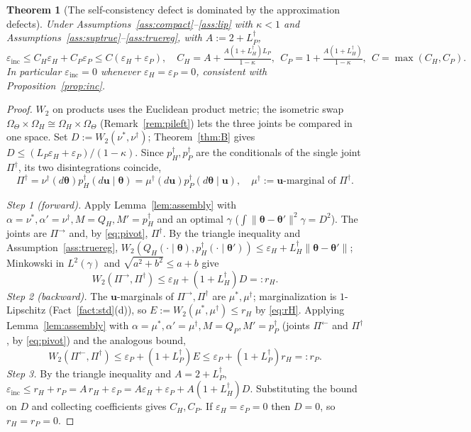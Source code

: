 \documentclass[11pt]{article}
\theoremstyle{plain}
\newtheorem{theorem}{Theorem}
\theoremstyle{definition}
\theoremstyle{remark}
\newcommand{\Om}{\Omega}
\newcommand{\bth}{\bm{\theta}}
\newcommand{\bu}{\bm{u}}
\newcommand{\norm}[1]{\lVert #1 \rVert}
\newcommand{\einc}{\varepsilon_{\mathrm{inc}}}
\begin{document}
\begin{theorem}[The self-consistency defect is dominated by the approximation defects]
\label{thm:incbound}
Under Assumptions~\ref{ass:compact}--\ref{ass:lip} with $\kappa<1$ and
Assumptions~\ref{ass:suptrue}--\ref{ass:truereg}, with $A:=2+L_P^\dagger$,
\[
  \einc\le C_H\varepsilon_H+C_P\varepsilon_P\le C(\varepsilon_H+\varepsilon_P),\quad
  C_H=A+\tfrac{A(1+L_H^\dagger)L_P}{1-\kappa},\ \
  C_P=1+\tfrac{A(1+L_H^\dagger)}{1-\kappa},\ \ C=\max(C_H,C_P).
\]
In particular $\einc=0$ whenever $\varepsilon_H=\varepsilon_P=0$, consistent with
Proposition~\ref{prop:inc}.
\end{theorem}
\begin{proof}
$W_2$ on products uses the Euclidean product metric; the isometric swap
$\Om_\Theta\times\Om_H\cong\Om_H\times\Om_\Theta$ (Remark~\ref{rem:pileft}) lets the three joints be
compared in one space. Set $D:=W_2(\nu^\ast,\nu^\dagger)$; Theorem~\ref{thm:B} gives
$D\le(L_P\varepsilon_H+\varepsilon_P)/(1-\kappa)$. Since $p^\dagger_H,p^\dagger_P$ are the conditionals
of the single joint $\Pi^\dagger$, its two disintegrations coincide,
\begin{equation}\label{eq:pivot}
  \Pi^\dagger=\nu^\dagger(d\bth)p^\dagger_H(d\bu\mid\bth)=\mu^\dagger(d\bu)p^\dagger_P(d\bth\mid\bu),
  \quad\mu^\dagger:=\text{$\bu$-marginal of }\Pi^\dagger .
\end{equation}

\emph{Step 1 (forward).} Apply Lemma~\ref{lem:assembly} with $\alpha=\nu^\ast,\alpha'=\nu^\dagger,
M=Q_H,M'=p^\dagger_H$ and an optimal $\gamma$ ($\int\norm{\bth-\bth'}^2\gamma=D^2$). The joints are
$\Pi^\rightarrow$ and, by \eqref{eq:pivot}, $\Pi^\dagger$. By the triangle inequality and
Assumption~\ref{ass:truereg}, $W_2(Q_H(\cdot\mid\bth),p^\dagger_H(\cdot\mid\bth'))\le\varepsilon_H+
L_H^\dagger\norm{\bth-\bth'}$; Minkowski in $L^2(\gamma)$ and $\sqrt{a^2+b^2}\le a+b$ give
\begin{equation}\label{eq:rH}
  W_2(\Pi^\rightarrow,\Pi^\dagger)\le\varepsilon_H+(1+L_H^\dagger)D=:r_H.
\end{equation}
\emph{Step 2 (backward).} The $\bu$-marginals of $\Pi^\rightarrow,\Pi^\dagger$ are $\mu^\ast,\mu^\dagger$;
marginalization is $1$-Lipschitz (Fact~\ref{fact:std}(d)), so $E:=W_2(\mu^\ast,\mu^\dagger)\le r_H$ by
\eqref{eq:rH}. Applying Lemma~\ref{lem:assembly} with $\alpha=\mu^\ast,\alpha'=\mu^\dagger,M=Q_P,
M'=p^\dagger_P$ (joints $\Pi^\leftarrow$ and $\Pi^\dagger$, by \eqref{eq:pivot}) and the analogous bound,
\begin{equation}\label{eq:rP}
  W_2(\Pi^\leftarrow,\Pi^\dagger)\le\varepsilon_P+(1+L_P^\dagger)E\le\varepsilon_P+(1+L_P^\dagger)r_H=:r_P.
\end{equation}
\emph{Step 3.} By the triangle inequality and $A=2+L_P^\dagger$,
$\einc\le r_H+r_P=A\,r_H+\varepsilon_P=A\varepsilon_H+\varepsilon_P+A(1+L_H^\dagger)D$. Substituting the
bound on $D$ and collecting coefficients gives $C_H,C_P$. If $\varepsilon_H=\varepsilon_P=0$ then $D=0$,
so $r_H=r_P=0$.
\end{proof}
\end{document}
